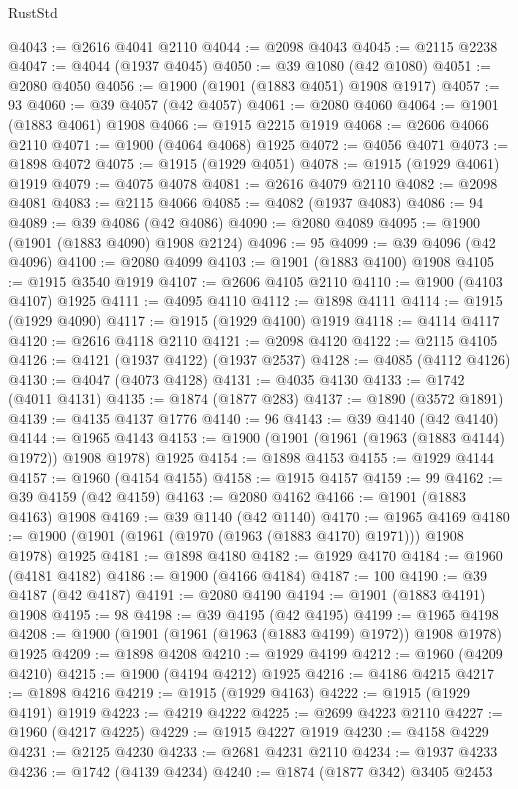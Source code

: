 \begin{lexlean}{RustStd}
\begin{coremodule}
{\begin{coremodule}
{{{{{{{{{{{{{{{{{{{{{{{{{{{{{{{{{{{{{{{{{{{@4043 := @2616 @4041 @2110
@4044 := @2098 @4043
@4045 := @2115 @2238
@4047 := @4044 (@1937 @4045)
@4050 := @39 @1080 (@42 @1080)
@4051 := @2080 @4050
@4056 := @1900 (@1901 (@1883 @4051) @1908 @1917)
@4057 := 93
@4060 := @39 @4057 (@42 @4057)
@4061 := @2080 @4060
@4064 := @1901 (@1883 @4061) @1908
@4066 := @1915 @2215 @1919
@4068 := @2606 @4066 @2110
@4071 := @1900 (@4064 @4068) @1925
@4072 := @4056 @4071
@4073 := @1898 @4072
@4075 := @1915 (@1929 @4051)
@4078 := @1915 (@1929 @4061) @1919
@4079 := @4075 @4078
@4081 := @2616 @4079 @2110
@4082 := @2098 @4081
@4083 := @2115 @4066
@4085 := @4082 (@1937 @4083)
@4086 := 94
@4089 := @39 @4086 (@42 @4086)
@4090 := @2080 @4089
@4095 := @1900 (@1901 (@1883 @4090) @1908 @2124)
@4096 := 95
@4099 := @39 @4096 (@42 @4096)
@4100 := @2080 @4099
@4103 := @1901 (@1883 @4100) @1908
@4105 := @1915 @3540 @1919
@4107 := @2606 @4105 @2110
@4110 := @1900 (@4103 @4107) @1925
@4111 := @4095 @4110
@4112 := @1898 @4111
@4114 := @1915 (@1929 @4090)
@4117 := @1915 (@1929 @4100) @1919
@4118 := @4114 @4117
@4120 := @2616 @4118 @2110
@4121 := @2098 @4120
@4122 := @2115 @4105
@4126 := @4121 (@1937 @4122) (@1937 @2537)
@4128 := @4085 (@4112 @4126)
@4130 := @4047 (@4073 @4128)
@4131 := @4035 @4130
@4133 := @1742 (@4011 @4131)
@4135 := @1874 (@1877 @283)
@4137 := @1890 (@3572 @1891)
@4139 := @4135 @4137 @1776
@4140 := 96
@4143 := @39 @4140 (@42 @4140)
@4144 := @1965 @4143
@4153 := @1900 (@1901 (@1961 (@1963 (@1883 @4144) @1972)) @1908 @1978) @1925
@4154 := @1898 @4153
@4155 := @1929 @4144
@4157 := @1960 (@4154 @4155)
@4158 := @1915 @4157
@4159 := 99
@4162 := @39 @4159 (@42 @4159)
@4163 := @2080 @4162
@4166 := @1901 (@1883 @4163) @1908
@4169 := @39 @1140 (@42 @1140)
@4170 := @1965 @4169
@4180 := @1900 (@1901 (@1961 (@1970 (@1963 (@1883 @4170) @1971))) @1908 @1978) @1925
@4181 := @1898 @4180
@4182 := @1929 @4170
@4184 := @1960 (@4181 @4182)
@4186 := @1900 (@4166 @4184)
@4187 := 100
@4190 := @39 @4187 (@42 @4187)
@4191 := @2080 @4190
@4194 := @1901 (@1883 @4191) @1908
@4195 := 98
@4198 := @39 @4195 (@42 @4195)
@4199 := @1965 @4198
@4208 := @1900 (@1901 (@1961 (@1963 (@1883 @4199) @1972)) @1908 @1978) @1925
@4209 := @1898 @4208
@4210 := @1929 @4199
@4212 := @1960 (@4209 @4210)
@4215 := @1900 (@4194 @4212) @1925
@4216 := @4186 @4215
@4217 := @1898 @4216
@4219 := @1915 (@1929 @4163)
@4222 := @1915 (@1929 @4191) @1919
@4223 := @4219 @4222
@4225 := @2699 @4223 @2110
@4227 := @1960 (@4217 @4225)
@4229 := @1915 @4227 @1919
@4230 := @4158 @4229
@4231 := @2125 @4230
@4233 := @2681 @4231 @2110
@4234 := @1937 @4233
@4236 := @1742 (@4139 @4234)
@4240 := @1874 (@1877 @342) @3405 @2453
}}}}}}}}}}}}}}}}}}}}}}}}}}}}}}}}}}}}}}}}}}}
\end{coremodule}}
\end{coremodule}
\end{lexlean}
